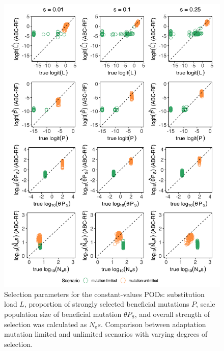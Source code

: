 \documentclass[a4paper, 12pt]{article}
\begin{document}
\begin{figure}[!htb]
  \centering
  \label{fig:fig3}
  \includegraphics[width=1\textwidth]{Figures/pred_plots_ggplot2_fixed_selection_2.pdf}
  \captionsetup{font=footnotesize}
  \caption{Selection parameters for the constant-values PODs: substitution load $L$, proportion of strongly selected beneficial mutations $P$, scale population size of beneficial mutation $\theta P_{\mathrm{S}}$, and overall strength of selection was calculated as $N_{\mathrm{e}}s$. Comparison between adaptation mutation limited and unlimited scenarios with varying degrees of selection.}
\end{figure}
\end{document}
